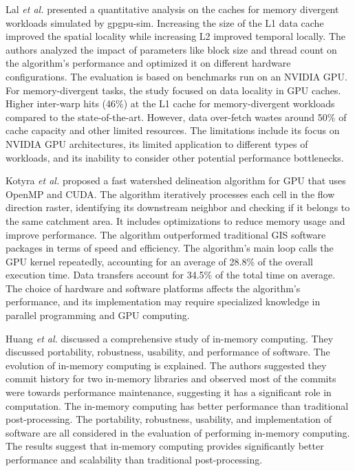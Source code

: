 \documentclass[journal, a4paper]{IEEEtran}
\begin{document}
	Lal \textit{et al.} \cite{10.1007/978-3-030-60939-9_16} presented a quantitative analysis on the caches for memory divergent workloads simulated by gpgpu-sim. Increasing the size of the L1 data cache improved the spatial locality while increasing L2 improved temporal locally. The authors analyzed the impact of parameters like block size and thread count on the algorithm's performance and optimized it on different hardware configurations. The evaluation is based on benchmarks run on an NVIDIA GPU. For memory-divergent tasks, the study focused on data locality in GPU caches. Higher inter-warp hits (46\%) at the L1 cache for memory-divergent workloads compared to the state-of-the-art. However, data over-fetch wastes around 50\% of cache capacity and other limited resources. The limitations include its focus on NVIDIA GPU architectures, its limited application to different types of workloads, and its inability to consider other potential performance bottlenecks.
	
	Kotyra \textit{et al.} \cite{KOTYRA2023105613} proposed a fast watershed delineation algorithm for GPU that uses OpenMP and CUDA. The algorithm iteratively processes each cell in the flow direction raster, identifying its downstream neighbor and checking if it belongs to the same catchment area. It includes optimizations to reduce memory usage and improve performance. The algorithm outperformed traditional GIS software packages in terms of speed and efficiency. The algorithm's main loop calls the GPU kernel repeatedly, accounting for an average of 28.8\% of the overall execution time. Data transfers account for 34.5\% of the total time on average. The choice of hardware and software platforms affects the algorithm's performance, and its implementation may require specialized knowledge in parallel programming and GPU computing.
	
	Huang \textit{et al.} \cite{HUANG2022106} discussed a comprehensive study of in-memory computing.	They discussed portability, robustness, usability, and performance of software. The evolution of in-memory computing is explained. The authors suggested they commit history for two in-memory libraries and observed most of the commits	were towards performance maintenance, suggesting it has a significant role in computation. The in-memory computing has better performance than traditional post-processing. The portability, robustness, usability, and implementation of software are all considered in the evaluation of performing in-memory computing. The results suggest that in-memory computing provides significantly better performance and scalability than traditional post-processing.
	

	
	
	
\end{document}
